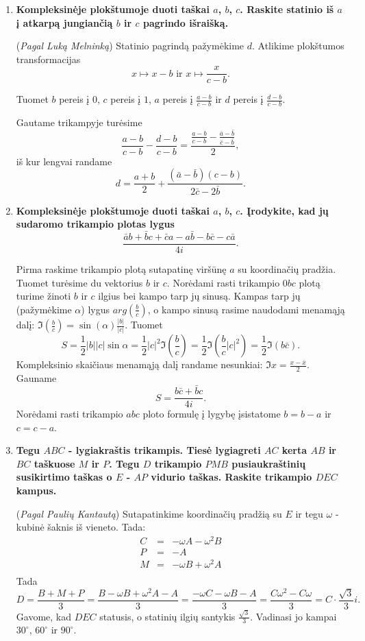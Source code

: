\begin{enumerate}
\item \textbf{Kompleksinėje plokštumoje duoti taškai $a$, $b$, $c$. Raskite statinio iš $a$ į atkarpą jungiančią $b$ ir $c$ pagrindo išraišką. }
\medskip

(\emph{Pagal Luką Melninką})
Statinio pagrindą pažymėkime $d$. 
Atlikime plokštumos transformacijas $$x \mapsto x - b \text{ ir } x \mapsto \frac{x}{c-b}.$$ 

Tuomet $b$ pereis į $0$, $c$ pereis į $1$, $a$ pereis į $\frac{a-b}{c-b}$ ir $d$ pereis į $\frac{d-b}{c-b}$.

Gautame trikampyje turėsime $$\frac{a-b}{c-b} - \frac{d-b}{c-b} = \frac{\frac{a-b}{c-b} - \frac{\bar{a}-\bar{b}}{\bar{c}-\bar{b}}}{2},$$ iš kur lengvai randame 
$$d = \frac{a+b}{2} + \frac{(\bar{a}-\bar{b})(c-b)}{2\bar{c}-2\bar{b}}.$$
\medskip

\item \textbf{Kompleksinėje plokštumoje duoti taškai $a$, $b$, $c$. Įrodykite, kad jų sudaromo trikampio plotas lygus $$\frac{\bar{a}b + \bar{b}c + \bar{c}a - a\bar{b} - b\bar{c} - c\bar{a}}{4i}.$$} 
\medskip

Pirma raskime trikampio plotą sutapatinę viršūnę $a$ su koordinačių pradžia. Tuomet turėsime du vektorius $b$ ir $c$. Norėdami rasti trikampio $0bc$ plotą turime žinoti $b$ ir $c$ ilgius bei kampo tarp jų sinusą. Kampas tarp jų (pažymėkime $\alpha$) lygus $arg(\frac{b}{c})$, o kampo sinusą rasime naudodami menamąją dalį: $\Im(\frac{b}{c}) = \sin(\alpha)\frac{|b|}{|c|}$. Tuomet $$S = \frac{1}{2}|b||c|\sin \alpha = \frac{1}{2}|c|^2 \Im(\frac{b}{c}) = \frac{1}{2} \Im(\frac{b}{c} |c|^2) = \frac{1}{2} \Im(b\bar{c}).$$
Kompleksinio skaičiaus menamąją dalį randame nesunkiai: $\Im x = \frac{x-\bar{x}}{2}$.  Gauname
$$S = \frac{b\bar{c} + \bar{b}c}{4i}.$$
Norėdami rasti trikampio $abc$ ploto formulę į lygybę įsistatome $b = b-a$ ir $c = c-a$. 
\medskip

\item \textbf{Tegu $ABC$ - lygiakraštis trikampis. Tiesė lygiagreti $AC$ kerta $AB$ ir $BC$ taškuose $M$ ir $P$. Tegu $D$ trikampio $PMB$ pusiaukraštinių susikirtimo taškas o $E$ - $AP$ vidurio taškas. Raskite trikampio $DEC$ kampus.}
\medskip

(\emph{Pagal Paulių Kantautą})
Sutapatinkime koordinačių pradžią su $E$ ir tegu $\omega$ - kubinė šaknis iš vieneto. Tada:
\begin{eqnarray*}
C &=& -\omega A - \omega^2 B\\
P &=& -A\\
M &=& -\omega B + \omega^2 A\\
\end{eqnarray*}
Tada $$D = \frac{B+M+P}{3} = \frac{B-\omega B +\omega^2 A -A}{3} = \frac{-\omega C - \omega B - A}{3} = \frac{C\omega^2 - C\omega }{3} = C\cdot\frac{\sqrt{3}}{3}i.$$ Gavome, kad $DEC$ statusis, o statinių ilgių santykis $\frac{\sqrt{3}}{3}$. Vadinasi jo kampai $30^{\circ}$, $60^{\circ}$ ir $90^{\circ}$.
\medskip


\end{enumerate}
